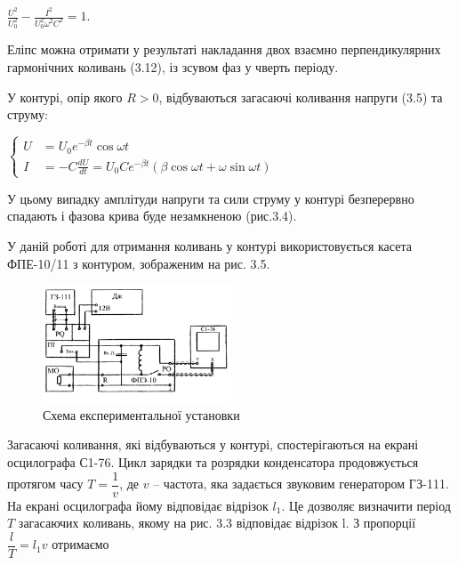 \documentclass[12pt,a4paper]{article}
\begin{document}
    \begin{center}
        $\displaystyle \frac{U^2}{U_0^2} - \frac{I^2}{U_0^2 \omega^2 C^2} = 1$.
    \end{center}

    Еліпс можна отримати у результаті накладання двох взаємно перпендикулярних
    гармонічних коливань (3.12), із зсувом фаз у чверть періоду.

    У контурі, опір якого $R>0$, відбуваються загасаючі коливання напруги (3.5) та струму:
    \begin{center}
        $
        \left\{
        \begin{aligned}
            U &= U_0 e^{-\beta t} \cos \omega t \\
            I &= -C \frac{dU}{dt} = U_0C e^{-\beta t} (\beta \cos \omega t + \omega \sin \omega t)
        \end{aligned}
        \right.
        $
    \end{center}

    У цьому випадку амплітуди напруги та сили струму у контурі безперервно
    спадають і фазова крива буде незамкненою (рис.3.4).

    У даній роботі для отримання коливань у контурі використовується касета
    ФПЕ-10/11 з контуром, зображеним на рис. 3.5.

    \begin{figure}[h!]

        \renewcommand{\thefigure}{3.\arabic{figure}} %

        \centering
        \includegraphics[width=0.5\textwidth]{3.5.png}
        \caption{Схема експериментальної установки}
        \label{fig5:schema}

    \end{figure}

    Загасаючі коливання, які відбуваються у контурі, спостерігаються на екрані
    осцилографа С1-76. Цикл зарядки та розрядки конденсатора продовжується
    протягом часу $T = \dfrac{1}{v}$, де $v$ – частота, яка задається звуковим
    генератором ГЗ-111. На екрані осцилографа йому відповідає відрізок $l_1$.
    Це дозволяє визначити період $T$ загасаючих коливань,
    якому на рис. 3.3 відповідає відрізок l. З пропорції $\dfrac{l}{T} = l_1v$ отримаємо
\end{document}

